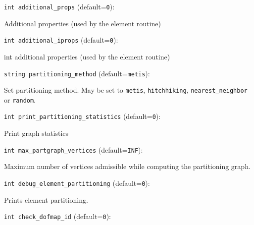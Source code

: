 \item\verb+int additional_props+ {\rm(default=\verb|0|)}:

Additional properties (used by the element routine)

\item\verb+int additional_iprops+ {\rm(default=\verb|0|)}:

int additional properties (used by the element routine)

\item\verb+string partitioning_method+ {\rm(default=\verb|metis|)}:

Set partitioning method. May be set to \verb+metis+,
\verb+hitchhiking+, \verb+nearest_neighbor+ or \verb+random+.

\item\verb+int print_partitioning_statistics+ {\rm(default=\verb|0|)}:

Print graph statistics

\item\verb+int max_partgraph_vertices+ {\rm(default=\verb|INF|)}:

Maximum number of vertices admissible while computing the
partitioning graph.

\item\verb+int debug_element_partitioning+ {\rm(default=\verb|0|)}:

Prints element partitioning. 

\item\verb+int check_dofmap_id+ {\rm(default=\verb|0|)}:

